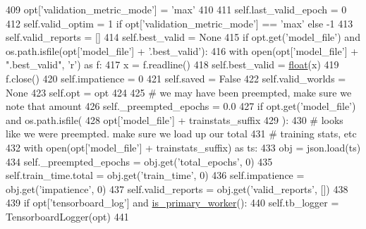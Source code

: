 \begin{DoxyCode}
409             opt[\textcolor{stringliteral}{'validation\_metric\_mode'}] = \textcolor{stringliteral}{'max'}
410 
411         self.last\_valid\_epoch = 0
412         self.valid\_optim = 1 \textcolor{keywordflow}{if} opt[\textcolor{stringliteral}{'validation\_metric\_mode'}] == \textcolor{stringliteral}{'max'} \textcolor{keywordflow}{else} -1
413         self.valid\_reports = []
414         self.best\_valid = \textcolor{keywordtype}{None}
415         \textcolor{keywordflow}{if} opt.get(\textcolor{stringliteral}{'model\_file'}) \textcolor{keywordflow}{and} os.path.isfile(opt[\textcolor{stringliteral}{'model\_file'}] + \textcolor{stringliteral}{'.best\_valid'}):
416             with open(opt[\textcolor{stringliteral}{'model\_file'}] + \textcolor{stringliteral}{".best\_valid"}, \textcolor{stringliteral}{'r') as f:}
417 \textcolor{stringliteral}{                x = f.readline()}
418 \textcolor{stringliteral}{                self.best\_valid = \hyperlink{namespaceprojects_1_1controllable__dialogue_1_1make__control__dataset_aa2b7207688c641dbc094ab44eca27113}{float}(x)}
419 \textcolor{stringliteral}{                f.close()}
420 \textcolor{stringliteral}{        self.impatience = 0}
421 \textcolor{stringliteral}{        self.saved = }\textcolor{keyword}{False}
422         self.valid\_worlds = \textcolor{keywordtype}{None}
423         self.opt = opt
424 
425         \textcolor{comment}{# we may have been preempted, make sure we note that amount}
426         self.\_preempted\_epochs = 0.0
427         \textcolor{keywordflow}{if} opt.get(\textcolor{stringliteral}{'model\_file'}) \textcolor{keywordflow}{and} os.path.isfile(
428             opt[\textcolor{stringliteral}{'model\_file'}] + trainstats\_suffix
429         ):
430             \textcolor{comment}{# looks like we were preempted. make sure we load up our total}
431             \textcolor{comment}{# training stats, etc}
432             with open(opt[\textcolor{stringliteral}{'model\_file'}] + trainstats\_suffix) \textcolor{keyword}{as} ts:
433                 obj = json.load(ts)
434                 self.\_preempted\_epochs = obj.get(\textcolor{stringliteral}{'total\_epochs'}, 0)
435                 self.train\_time.total = obj.get(\textcolor{stringliteral}{'train\_time'}, 0)
436                 self.impatience = obj.get(\textcolor{stringliteral}{'impatience'}, 0)
437                 self.valid\_reports = obj.get(\textcolor{stringliteral}{'valid\_reports'}, [])
438 
439         \textcolor{keywordflow}{if} opt[\textcolor{stringliteral}{'tensorboard\_log'}] \textcolor{keywordflow}{and} \hyperlink{namespaceparlai_1_1utils_1_1distributed_a9bb1dac198180590ef8c6b6c6f9fc2c4}{is\_primary\_worker}():
440             self.tb\_logger = TensorboardLogger(opt)
441 
\end{DoxyCode}


